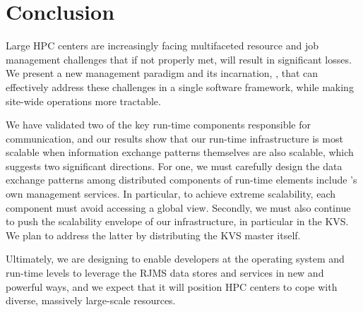 \section{Conclusion}
Large HPC centers are increasingly facing 
multifaceted resource and job management challenges
that if not properly met, will result 
in significant losses.  
We present a new management paradigm and its incarnation, \flux, that can effectively
address these challenges in a single software framework,
while making site-wide operations more tractable.

We have validated two of the key run-time components responsible for communication,
and our results show that our run-time 
infrastructure is most scalable when information 
exchange patterns themselves are also scalable, which suggests two significant directions. 
For one, we must carefully design the data exchange patterns
among distributed components of run-time elements include \flux's own management services. 
In particular, to achieve extreme scalability, each component 
must avoid accessing a global view.
Secondly, we must also continue to push the 
scalability envelope of our infrastructure, in particular in the
KVS. We plan to address the latter by 
distributing the KVS master itself.
%

Ultimately, we are designing \flux to  
enable developers at the operating system and
run-time levels to leverage the RJMS data stores and services in
new and powerful ways, and we expect that it will position HPC centers to cope
with diverse, massively large-scale resources.
